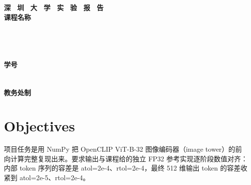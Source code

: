 \documentclass[a4paper,12pt]{article}
\begin{document}
\begin{titlepage}
    \centering
    \vspace*{2cm}
    \Huge{\textbf{深 \ 圳 \ 大 \ 学 \ 实 \ 验  \ 报 \ 告}}\\[1.5cm]

    {\Large\textbf{课程名称}\quad\underline{}}\\[0.5cm]
{\Large
\noindent{}
\underline{}}\\[0.5cm]
{\Large
\noindent{}
\underline{}}\\[0.5cm]
{\Large
\noindent{}
\underline{}}\\[0.5cm]
{\Large
\noindent{}
\underline{}}\\[0.5cm]
{\Large
\noindent{}
\underline{}
\hspace{0.5cm}
\textbf{学号}
\underline{}}\\[0.5cm]
{\Large
\noindent{}
\underline{}}\\[0.5cm]
{\Large
\noindent{}
\underline{}}\\[1.5cm]

    \vfill
    \Large{\textbf{教务处制}}
\end{titlepage}

\newpage


\section{Objectives}

项目任务是用 NumPy 把 OpenCLIP
ViT-B-32 图像编码器（image tower）的前向计算完整复现出来。要求输出与课程给的独立 FP32 参考实现逐阶段数值对齐：
内部 token 序列的容差是 atol=2e-4、rtol=2e-4，最终 512 维输出 token 的容差收紧到
atol=2e-5、rtol=2e-4。
\end{document}
